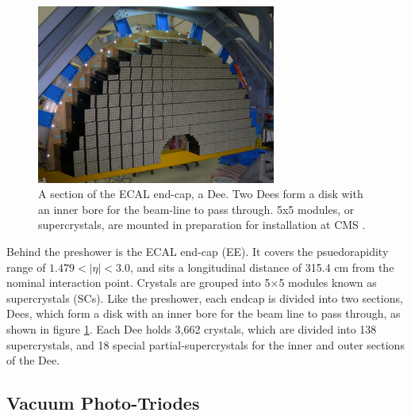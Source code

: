 \begin{figure}[h]
   \centering
  \includegraphics[width=0.7\textwidth]{Figures/CMS_Diagrams/ECAL__EndCap_Dee.pdf}
  \caption{A section of the ECAL end-cap, a Dee.  Two Dees form a disk
  with an inner bore for the beam-line to pass through.  5x5 modules,
  or supercrystals, are mounted in preparation for installation at CMS
\cite{CMS:CMS_Machine_Chatrchyan:2008aa}. } \label{fig:ecal_endcap_dee}
\end{figure}

\par Behind the preshower is the ECAL end-cap (EE).  It covers the
psuedorapidity range of $1.479<|\eta|<3.0$, and sits a longitudinal
distance of 315.4 cm from the nominal interaction point.  Crystals are
grouped into 5$\times$5 modules known as supercrystals (SCs).  Like
the preshower, each endcap is divided into two sections, Dees, which
form a disk with an inner bore for the beam line to pass through, as
shown in figure \ref{fig:ecal_endcap_dee}.  Each Dee holds 3,662
crystals, which are divided into 138 supercrystals, and 18 special
partial-supercrystals for the inner and outer sections of the Dee.  

\subsection{Vacuum Photo-Triodes}
\label{vpt_description}

